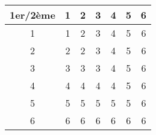 \documentclass{standalone}
\begin{document}
	\tiny{
\begin{center}
	\begin{tabular}{|c||c|c|c|c|c|c|}\hline 1er/2\`eme & 1 & 2 & 3 & 4 & 5 & 6 \\ \hline\hline 1 & 1 & 2 & 3 & 4 & 5 & 6 \\\hline 2 & 2 & 2 & 3 & 4 & 5 & 6 \\\hline 3 & 3 & 3 & 3 & 4 & 5 & 6 \\\hline 4 & 4 & 4 & 4 & 4 & 5 & 6 \\\hline 5 & 5 & 5 & 5 & 5 & 5 & 6 \\\hline 6 & 6 & 6 & 6 & 6 & 6 & 6 \\\hline \end{tabular}
\end{center}}
\end{document}
